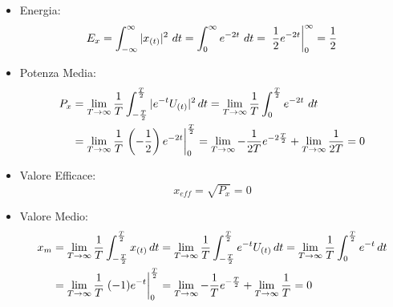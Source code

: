         \begin{itemize}
            \item {Energia:
                \[
                    E_{x} = \int_{-\infty}^{\infty} |x_{(t)}|^2 \ dt = \int_{0}^{\infty} e^{-2t}\ dt = \eval*{\frac{1}{2} e^{-2t}}_{0}^{\infty} = \frac{1}{2} 
                \]
            }
            \item {Potenza Media:
                \begin{align}
                    P_{x} & =\lim_{T\rightarrow\infty}  \frac{1}{T} \int_{-\frac{T}{2}}^{\frac{T}{2}}  |e^{-t}U_{(t)}|^2 \,dt =\lim_{T\rightarrow\infty} \frac{1}{T} \int_{0}^{\frac{T}{2}} e^{-2t}\ dt \nonumber \\
                          & = \lim_{T\rightarrow\infty} \frac{1}{T} \eval*{\left(-\frac{1}{2}\right) e^{-2t}}_{0}^{\frac{T}{2}} =\lim_{T\rightarrow\infty}-\frac{1}{2T} e^{-2\frac{T}{2}} + \lim_{T\rightarrow\infty} \frac{1}{2T} = 0 \nonumber 
                \end{align}
            }
            \item {Valore Efficace:
                \[
                    x_{eff} = \sqrt{P_{x}} = 0 
                \]
            }
            \item {Valore Medio:
                    \begin{align}
                        x_{m} & = \lim_{T\rightarrow\infty} \frac{1}{T} \int_{-\frac{T}{2}}^{\frac{T}{2}}  x_{(t)} \,dt =\lim_{T\rightarrow\infty} \frac{1}{T} \int_{-\frac{T}{2}}^{\frac{T}{2}} e^{-t}U_{(t)}\,dt = \lim_{T\rightarrow\infty} \frac{1}{T} \int_{0}^{\frac{T}{2}} e^{-t}\,dt \nonumber \\
                              & = \lim_{T\rightarrow\infty} \frac{1}{T} \eval*{(-1) e^{-t}}_{0}^{\frac{T}{2}} =  \lim_{T\rightarrow\infty}-\frac{1}{T} e^{-\frac{T}{2}} + \lim_{T\rightarrow\infty} \frac{1}{T} = 0 \nonumber
                    \end{align}
            }
        \end{itemize}
        
        \pagebreak
